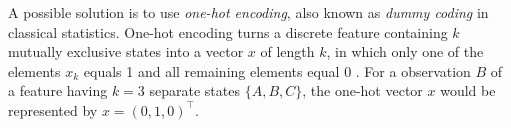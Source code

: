 A possible solution is to use \textit{one-hot encoding}, also known as \textit{dummy coding} in classical statistics. One-hot encoding turns a discrete feature containing $k$ mutually exclusive states into a vector $x$ of length $k$, in which only one of the elements $x_k$ equals 1 and all remaining elements equal 0 \cite{bishop_2006}. For a observation $B$ of a feature having $k=3$ separate states $\{A, B, C\}$, the one-hot vector $x$ would be represented by $x = (0, 1, 0)^{\intercal}$.












